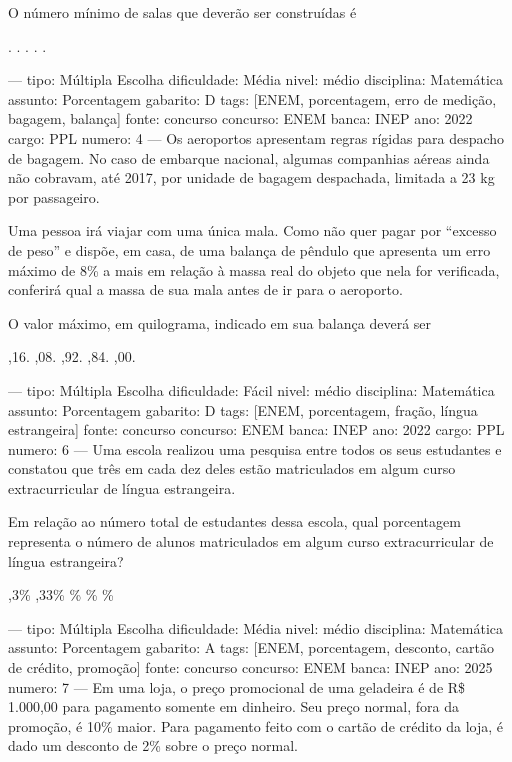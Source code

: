 O número mínimo de salas que deverão ser construídas é
\begin{choices}
.
.
.
.
.
\end{choices}

---
tipo: Múltipla Escolha
dificuldade: Média
nivel: médio
disciplina: Matemática
assunto: Porcentagem
gabarito: D
tags: [ENEM, porcentagem, erro de medição, bagagem, balança]
fonte: concurso
concurso: ENEM
banca: INEP
ano: 2022
cargo: PPL
numero: 4
---
\question
Os aeroportos apresentam regras rígidas para despacho de bagagem. No caso de embarque nacional, algumas companhias aéreas ainda não cobravam, até 2017, por unidade de bagagem despachada, limitada a 23 kg por passageiro.

Uma pessoa irá viajar com uma única mala. Como não quer pagar por ``excesso de peso'' e dispõe, em casa, de uma balança de pêndulo que apresenta um erro máximo de 8\% a mais em relação à massa real do objeto que nela for verificada, conferirá qual a massa de sua mala antes de ir para o aeroporto.

O valor máximo, em quilograma, indicado em sua balança deverá ser
\begin{choices}
,16.
,08.
,92.
,84.
,00.
\end{choices}

---
tipo: Múltipla Escolha
dificuldade: Fácil
nivel: médio
disciplina: Matemática
assunto: Porcentagem
gabarito: D
tags: [ENEM, porcentagem, fração, língua estrangeira]
fonte: concurso
concurso: ENEM
banca: INEP
ano: 2022
cargo: PPL
numero: 6
---
\question
Uma escola realizou uma pesquisa entre todos os seus estudantes e constatou que três em cada dez deles estão matriculados em algum curso extracurricular de língua estrangeira.

Em relação ao número total de estudantes dessa escola, qual porcentagem representa o número de alunos matriculados em algum curso extracurricular de língua estrangeira?
\begin{choices}
,3\%
,33\%
\%
\%
\%
\end{choices}

---
tipo: Múltipla Escolha
dificuldade: Média
nivel: médio
disciplina: Matemática
assunto: Porcentagem
gabarito: A
tags: [ENEM, porcentagem, desconto, cartão de crédito, promoção]
fonte: concurso
concurso: ENEM
banca: INEP
ano: 2025
numero: 7
---
\question
Em uma loja, o preço promocional de uma geladeira é de R\$ 1.000,00 para pagamento somente em dinheiro. Seu preço normal, fora da promoção, é 10\% maior. Para pagamento feito com o cartão de crédito da loja, é dado um desconto de 2\% sobre o preço normal.

